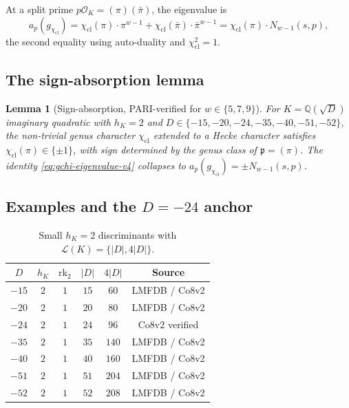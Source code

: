 \documentclass[11pt,a4paper]{amsart}
\newtheorem{lemma}[theorem]{Lemma}
\theoremstyle{definition}
\newcommand{\Q}{\mathbb{Q}}
\newcommand{\OK}{\mathcal{O}_K}
\newcommand{\fp}{\mathfrak{p}}
\newcommand{\Lcal}{\mathcal{L}}
\newcommand{\hK}{h_{K}}
\newcommand{\rktwo}{\mathrm{rk}_2}
\begin{document}
At a split prime $p\OK = (\pi)(\bar\pi)$, the eigenvalue is
\begin{equation}\label{eq:gchi-eigenvalue-v4}
a_p(g_{\chi_{\mathrm{cl}}}) = \chi_{\mathrm{cl}}(\pi) \cdot \pi^{w-1} + \chi_{\mathrm{cl}}(\bar\pi) \cdot \bar\pi^{w-1} = \chi_{\mathrm{cl}}(\pi) \cdot N_{w-1}(s, p),
\end{equation}
the second equality using auto-duality and $\chi_{\mathrm{cl}}^2 = 1$.

\subsection{The sign-absorption lemma}\label{sec:thmB-sign}

\begin{lemma}[Sign-absorption, PARI-verified for $w \in \{5, 7, 9\}$]\label{lem:sign-absorption}
For $K = \Q(\sqrt{D})$ imaginary quadratic with $\hK = 2$ and $D \in \{-15, -20, -24, -35, -40, -51, -52\}$, the non-trivial genus character $\chi_{\mathrm{cl}}$ extended to a Hecke character satisfies $\chi_{\mathrm{cl}}(\pi) \in \{\pm 1\}$, with sign determined by the genus class of $\fp = (\pi)$. The identity \eqref{eq:gchi-eigenvalue-v4} collapses to $a_p(g_{\chi_{\mathrm{cl}}}) = \pm N_{w-1}(s, p)$.
\end{lemma}

\subsection{Examples and the $D = -24$ anchor}\label{sec:thmB-examples}

\begin{table}[h]
\centering
\caption{Small $\hK = 2$ discriminants with $\Lcal(K) = \{|D|, 4|D|\}$.}
\label{tab:hK2-examples}
\begin{tabular}{cccccc}
\toprule
$D$ & $\hK$ & $\rktwo$ & $|D|$ & $4|D|$ & Source \\
\midrule
$-15$ & $2$ & $1$ & $15$ & $60$ & LMFDB / Co8v2 \\
$-20$ & $2$ & $1$ & $20$ & $80$ & LMFDB / Co8v2 \\
$-24$ & $2$ & $1$ & $24$ & $96$ & Co8v2 verified \\
$-35$ & $2$ & $1$ & $35$ & $140$ & LMFDB / Co8v2 \\
$-40$ & $2$ & $1$ & $40$ & $160$ & LMFDB / Co8v2 \\
$-51$ & $2$ & $1$ & $51$ & $204$ & LMFDB / Co8v2 \\
$-52$ & $2$ & $1$ & $52$ & $208$ & LMFDB / Co8v2 \\
\bottomrule
\end{tabular}
\end{table}
\end{document}
